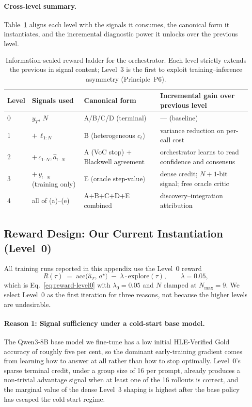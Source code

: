\paragraph{Cross-level summary.}
Table~\ref{tab:reward-ladder} aligns each level with the signals it consumes, the canonical form it instantiates, and the incremental diagnostic power it unlocks over the previous level.
\begin{table}[h]
\centering
\small
\begin{tabular}{l l l l}
\toprule
Level & Signals used & Canonical form & Incremental gain over previous level \\
\midrule
0 & $y_T,\,N$ & A/B/C/D (terminal) & --- (baseline) \\
1 & $+\,\ell_{1:N}$ & B (heterogeneous $c_t$) & variance reduction on per-call cost \\
2 & $+\,c_{1:N},\hat a_{1:N}$ & A (VoC stop) $+$ Blackwell agreement & orchestrator learns to read confidence and consensus \\
3 & $+\,y_{1:N}$ (training only) & E (oracle step-value) & dense credit; $N+1$-bit signal; free oracle critic \\
4 & all of (a)--(e) & A$+$B$+$C$+$D$+$E combined & discovery--integration attribution \\
\bottomrule
\end{tabular}
\caption{Information-scaled reward ladder for the \our{} orchestrator. Each level strictly extends the previous in signal content; Level~3 is the first to exploit training--inference asymmetry (Principle~P6).}
\label{tab:reward-ladder}
\end{table}

\subsection{Reward Design: Our Current Instantiation (Level~0)}
\label{app:training-reward-design}

All training runs reported in this appendix use the Level~0 reward
\begin{equation}
R(\tau) \;=\; \mathrm{acc}\bigl(\hat a_T,\,a^\star\bigr) \;-\; \lambda\cdot \mathrm{explore}(\tau),
\qquad \lambda = 0.05,
\label{eq:our-reward}
\end{equation}
which is Eq.~\eqref{eq:reward-level0} with $\lambda_0=0.05$ and $N$ clamped at $N_{\max}=9$. We select Level~0 as the first iteration for three reasons, not because the higher levels are undesirable.

\paragraph{Reason 1: Signal sufficiency under a cold-start base model.}
The Qwen3-8B base model we fine-tune has a low initial HLE-Verified Gold accuracy of roughly five per cent, so the dominant early-training gradient comes from learning how to answer at all rather than how to stop optimally. Level~0's sparse terminal credit, under a group size of 16 per prompt, already produces a non-trivial advantage signal when at least one of the 16 rollouts is correct, and the marginal value of the dense Level~3 shaping is highest after the base policy has escaped the cold-start regime.

